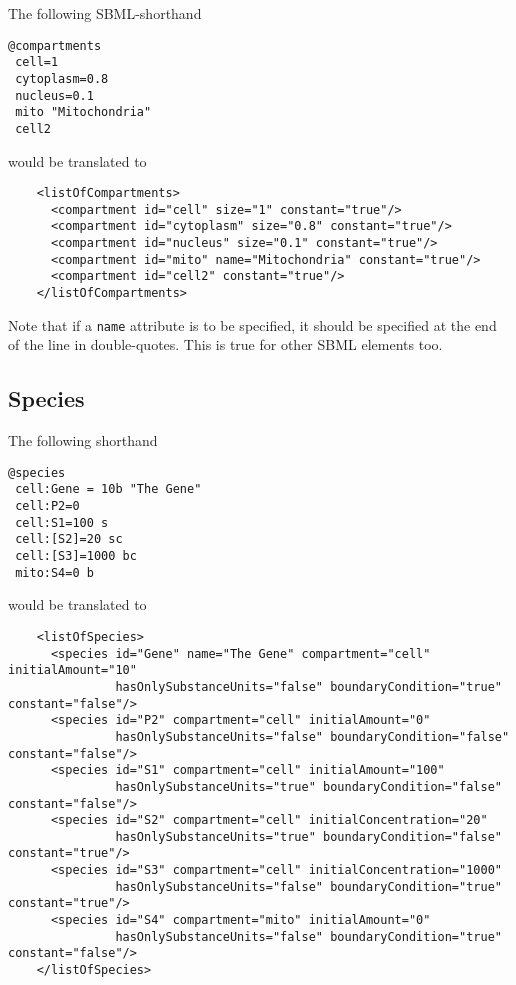 \documentclass[11pt,a4paper]{article}
\begin{document}
The following SBML-shorthand

{\small
\begin{verbatim}
@compartments
 cell=1
 cytoplasm=0.8
 nucleus=0.1
 mito "Mitochondria"
 cell2
\end{verbatim}}

\noindent would be translated to

{\small
\begin{verbatim}
    <listOfCompartments>
      <compartment id="cell" size="1" constant="true"/>
      <compartment id="cytoplasm" size="0.8" constant="true"/>
      <compartment id="nucleus" size="0.1" constant="true"/>
      <compartment id="mito" name="Mitochondria" constant="true"/>
      <compartment id="cell2" constant="true"/>
    </listOfCompartments>
\end{verbatim}}

\noindent Note that if a \verb$name$ attribute is to be specified, it should be
specified at the end of the line in double-quotes. This is true for
other SBML elements too.

\subsection{Species}

The following shorthand

{\small
\begin{verbatim}
@species
 cell:Gene = 10b "The Gene"
 cell:P2=0
 cell:S1=100 s
 cell:[S2]=20 sc
 cell:[S3]=1000 bc
 mito:S4=0 b
\end{verbatim}}

\noindent would be translated to

{\scriptsize
\begin{verbatim}
    <listOfSpecies>
      <species id="Gene" name="The Gene" compartment="cell" initialAmount="10"
               hasOnlySubstanceUnits="false" boundaryCondition="true" constant="false"/>
      <species id="P2" compartment="cell" initialAmount="0"
               hasOnlySubstanceUnits="false" boundaryCondition="false" constant="false"/>
      <species id="S1" compartment="cell" initialAmount="100"
               hasOnlySubstanceUnits="true" boundaryCondition="false" constant="false"/>
      <species id="S2" compartment="cell" initialConcentration="20"
               hasOnlySubstanceUnits="true" boundaryCondition="false" constant="true"/>
      <species id="S3" compartment="cell" initialConcentration="1000"
               hasOnlySubstanceUnits="false" boundaryCondition="true" constant="true"/>
      <species id="S4" compartment="mito" initialAmount="0"
               hasOnlySubstanceUnits="false" boundaryCondition="true" constant="false"/>
    </listOfSpecies>
\end{verbatim}}
\end{document}

